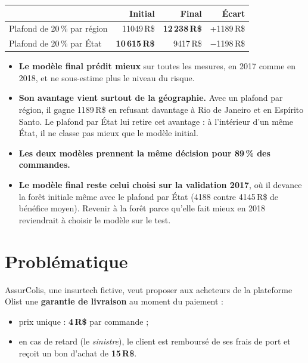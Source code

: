 \documentclass[11pt,a4paper]{article}
\newcommand{\RS}{\,R\$}
\begin{document}
\begin{center}
\begin{tabular}{@{}lrrr@{}}
\toprule
& Initial & Final & Écart \\
\midrule
Plafond de 20\,\% par région & \num{11049}\RS{} & \textbf{12\,238\RS{}} & +\num{1189}\RS{} \\
Plafond de 20\,\% par État & \textbf{10\,615\RS{}} & \num{9417}\RS{} & $-$\num{1198}\RS{} \\
\bottomrule
\end{tabular}
\end{center}

\begin{itemize}
  \item \textbf{Le modèle final prédit mieux} sur toutes les mesures, en 2017 comme en 2018, et
        ne sous-estime plus le niveau du risque.
  \item \textbf{Son avantage vient surtout de la géographie.} Avec un plafond par région, il
        gagne \num{1189}\RS{} en refusant davantage à Rio de Janeiro et en Espírito Santo. Le
        plafond par État lui retire cet avantage : à l'intérieur d'un même État, il ne classe pas
        mieux que le modèle initial.
  \item \textbf{Les deux modèles prennent la même décision pour 89\,\% des commandes.}
  \item \textbf{Le modèle final reste celui choisi sur la validation 2017}, où il devance la forêt
        initiale même avec le plafond par État (\num{4188} contre \num{4145}\RS{} de bénéfice
        moyen). Revenir à la forêt parce qu'elle fait mieux en 2018 reviendrait à choisir le modèle
        sur le test.
\end{itemize}

\newpage
\section{Problématique}

AssurColis, une insurtech fictive, veut proposer aux acheteurs de la plateforme Olist une
\textbf{garantie de livraison} au moment du paiement :
\begin{itemize}
  \item prix unique : \textbf{4\RS} par commande ;
  \item en cas de retard (le \emph{sinistre}), le client est remboursé de ses frais de port et
        reçoit un bon d'achat de \textbf{15\RS}.
\end{itemize}
\end{document}
